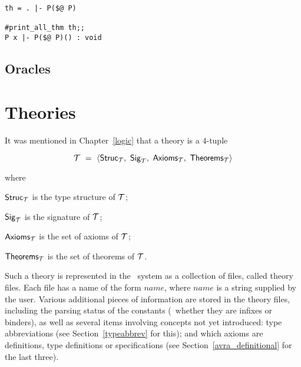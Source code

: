 \setcounter{sessioncount}{1}
\begin{session}\begin{verbatim}
th = . |- P($@ P)

#print_all_thm th;;
P x |- P($@ P)() : void
\end{verbatim}\end{session}

\subsection{Oracles}
\label{avra_theorems}

\section{Theories}
\label{theoryfns}

It was mentioned in Chapter~\ref{logic} that a theory is a $4$-tuple

\[ {\cal T}\ =\ \langle{\sf Struc}_{\cal T},\
                {\sf Sig}_{\cal T},\
                {\sf Axioms}_{\cal T},\
                {\sf Theorems}_{\cal T}\rangle \]

\noindent where
\begin{myenumerate}
\item ${\sf Struc}_{\cal T}$ is
the type structure of ${\cal T}$;
\item ${\sf Sig}_{\cal T}$ is
the signature of ${\cal T}$;
\item ${\sf Axioms}_{\cal T}$ is
the set of axioms of ${\cal T}$;
\item ${\sf Theorems}_{\cal T}$ is the set of
theorems of ${\cal T}$.
\end{myenumerate}

Such a theory is represented  in the  \HOL\ system  as a  collection of files,
called theory files. Each  file has  a name  of the  form $name$, where
$name$ is a string supplied by the user.  Various additional pieces of
information are stored in the theory files, including the parsing status of the
constants (\ie\ whether they are infixes or binders), as well as several items
involving concepts not yet introduced: type abbreviations (see
Section~\ref{typeabbrev} for this); and which axioms are definitions, type
definitions or specifications (see Section~\ref{avra_definitional} for the last
three).

